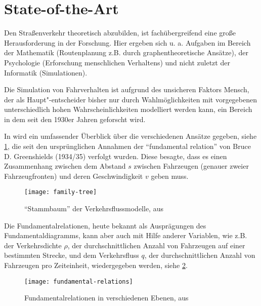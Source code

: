 \section{State-of-the-Art}
\label{sec:sota}

Den Straßenverkehr theoretisch abzubilden, ist fachübergreifend eine große Herausforderung in der Forschung.
Hier ergeben sich u. a. Aufgaben im Bereich der Mathematik (Routenplanung z.B. durch graphentheoretische Ansätze), der Psychologie (Erforschung menschlichen Verhaltens) und nicht zuletzt der Informatik (Simulationen).

Die Simulation von Fahrverhalten ist aufgrund des unsicheren Faktors Mensch, der als Haupt"-entscheider bisher nur durch Wahlmöglichkeiten mit vorgegebenen unterschiedlich hohen Wahrscheinlichkeiten modelliert werden kann, ein Bereich in dem seit den 1930er Jahren geforscht wird.

In \cite{genealogy} wird ein umfassender Überblick über die verschiedenen Ansätze gegeben, siehe \cref{figure:family-tree}, die seit den ursprünglichen Annahmen der \enquote{fundamental relation} von Bruce D. Greenshields (1934/35) verfolgt wurden. 
Diese besagte, dass es einen Zusammenhang zwischen dem Abstand $s$ zwischen Fahrzeugen (genauer zweier Fahrzeugfronten) und deren Geschwindigkeit $v$ geben muss.

\begin{figure}[hptb]
 \centering
 \texttt{[image: family-tree]}
 \caption[Überblick über die Entwicklung der Verkehrsflussmodelle]
 		{\enquote{Stammbaum} der Verkehrsflussmodelle, aus \cite{genealogy}}
 \label{figure:family-tree}
\end{figure}

\noindent
Die Fundamentalrelationen, heute bekannt als Ausprägungen des Fundamentaldiagramms, kann aber auch mit Hilfe anderer Variablen, wie z.B. der Verkehrsdichte $\rho$, der durchschnittlichen Anzahl von Fahrzeugen auf einer bestimmten Strecke, und dem Verkehrsfluss $q$, der durchschnittlichen Anzahl von Fahrzeugen pro Zeiteinheit, wiedergegeben werden, siehe \cref{figure:fundamental-relations}. 

\begin{figure}[hptb]
 \centering
 \texttt{[image: fundamental-relations]}
 \caption[Fundamentalrelationen in verschiedenen Ebenen]
 		{Fundamentalrelationen in verschiedenen Ebenen, aus \cite{genealogy}}
 \label{figure:fundamental-relations}
\end{figure}

